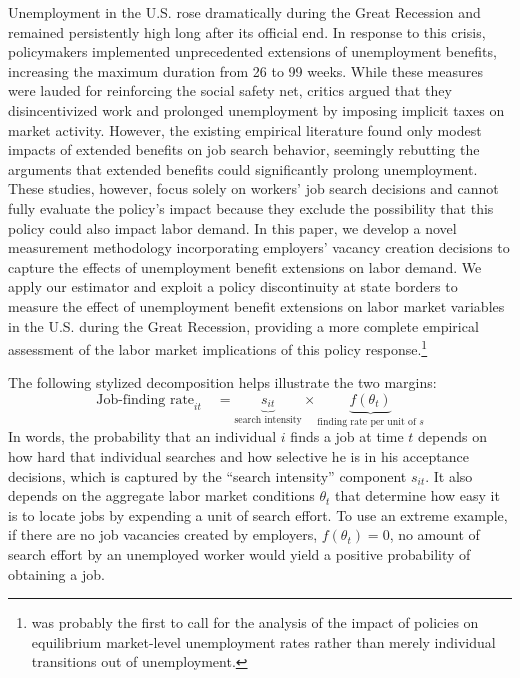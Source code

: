 \documentclass[12pt]{article}
\newcommand{\1}{\mathbf{1}}
\begin{document}
Unemployment in the U.S. rose dramatically during the Great Recession and remained persistently high long after its official end. In response to this crisis, policymakers implemented unprecedented extensions of unemployment benefits, increasing the maximum duration from 26 to 99 weeks. While these measures were lauded for reinforcing the social safety net, critics \citep[e.g.,][]{barro:10,mulligan:12} argued that they disincentivized work and prolonged unemployment by imposing implicit taxes on market activity. However, the existing empirical literature found only modest impacts of extended benefits on job search behavior, seemingly rebutting the arguments that extended benefits could significantly prolong unemployment. These studies, however, focus solely on workers' job search decisions and cannot fully evaluate the policy's impact because they exclude the possibility that this policy could also impact labor demand. In this paper, we develop a novel measurement methodology incorporating employers' vacancy creation decisions to capture the effects of unemployment benefit extensions on labor demand. We apply our estimator and exploit a policy discontinuity at state borders to measure the effect of unemployment benefit extensions on labor market variables in the U.S. during the Great Recession, providing a more complete empirical assessment of the labor market implications of this policy response.\footnote{\citet{feldstein:78} was probably the first to call for the analysis of the impact of policies on equilibrium market-level unemployment rates rather than merely individual transitions out of unemployment.}


The following stylized decomposition helps illustrate the two margins:
\begin{equation}
\label{eq:decomposition}
\text{Job-finding rate}_{it} \quad = \underbrace{s_{it}}_{\text{search intensity}}\times\underbrace{f(\theta_{t})}_{\text{finding rate per unit of } s}
\end{equation}
In words, the probability that an individual $i$ finds a job at time $t$ depends on how hard that individual searches and how selective he is in his acceptance decisions, which is captured by the ``search intensity'' component $s_{it}$. It also depends on the aggregate labor market conditions $\theta_t$ that determine how easy it is to locate jobs by expending a unit of search effort. To use an extreme example, if there are no job vacancies created by employers, $f(\theta_t)=0$, no amount of search effort by an unemployed worker would yield a positive probability of obtaining a job.
\end{document}
